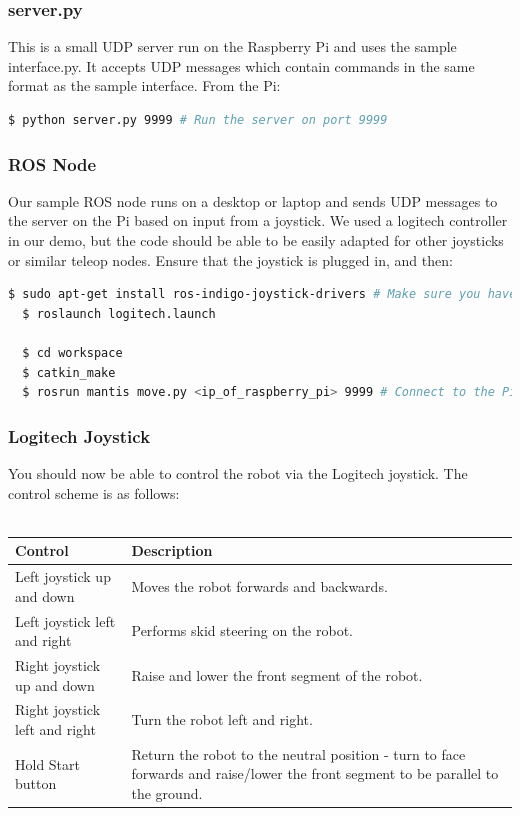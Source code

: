 \documentclass[]{article}
\begin{document}
\subsubsection{server.py}
This is a small UDP server run on the Raspberry Pi and uses the sample interface.py. It accepts UDP messages which contain commands in the same format as the sample interface. From the Pi:
\begin{lstlisting}[language=bash]
  $ python server.py 9999 # Run the server on port 9999
\end{lstlisting}

\subsubsection{ROS Node}
Our sample ROS node runs on a desktop or laptop and sends UDP messages to the server on the Pi based on input from a joystick. We used a logitech controller in our demo, but the code should be able to be easily adapted for other joysticks or similar teleop nodes. Ensure that the joystick is plugged in, and then:
\begin{lstlisting}[language=bash]
  $ sudo apt-get install ros-indigo-joystick-drivers # Make sure you have the joystick drivers
  $ roslaunch logitech.launch

  $ cd workspace
  $ catkin_make
  $ rosrun mantis move.py <ip_of_raspberry_pi> 9999 # Connect to the Pi on port 9999
\end{lstlisting}

\subsubsection{Logitech Joystick}
You should now be able to control the robot via the Logitech joystick. The control scheme is as follows:
\\ 
\\
\begin{tabular}{ | l | p{7cm} | }
\hline
\textbf{Control} & \textbf{Description} \\ \hline
Left joystick up and down & Moves the robot forwards and backwards. \\ \hline
Left joystick left and right & Performs skid steering on the robot. \\ \hline
Right joystick up and down & Raise and lower the front segment of the robot. \\ \hline
Right joystick left and right & Turn the robot left and right. \\ \hline
Hold Start button & Return the robot to the neutral position - turn to face forwards and raise/lower the front segment to be parallel to the ground. \\ \hline
\end{tabular}
\end{document}
